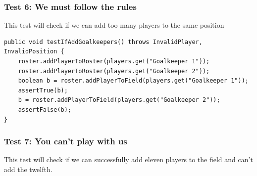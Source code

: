\documentclass{article}
\begin{document}
\subsubsection*{Test 6: We must follow the rules}
This test will check if we can add too many players to the same position
\begin{lstlisting}
public void testIfAddGoalkeepers() throws InvalidPlayer, InvalidPosition {
	roster.addPlayerToRoster(players.get("Goalkeeper 1"));
	roster.addPlayerToRoster(players.get("Goalkeeper 2"));
	boolean b = roster.addPlayerToField(players.get("Goalkeeper 1"));
	assertTrue(b);
	b = roster.addPlayerToField(players.get("Goalkeeper 2"));
	assertFalse(b);
}
\end{lstlisting}

\subsubsection*{Test 7: You can't play with us}
This test will check if we can successfully add eleven players to the field and can't add the twelfth.
\end{document}
